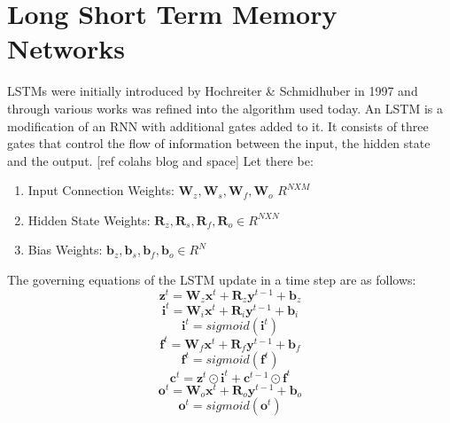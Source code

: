 \section{Long Short Term Memory Networks}
LSTMs were initially introduced by Hochreiter & Schmidhuber in 1997 and through various works was refined into the algorithm used today. An LSTM is a modification of an RNN with additional gates added to it. It consists of three gates that control the flow of information between the input, the hidden state and the output. [ref colahs blog and space]
Let there be:
\begin{enumerate}
    \item Input Connection Weights: $\mathbf{W}_z, \mathbf{W}_s, \mathbf{W}_f, \mathbf{W}_o$ \in $R^{NXM}$ 
    \item Hidden State Weights: $\mathbf{R}_z, \mathbf{R}_s, \mathbf{R}_f, \mathbf{R}_o \in R^{NXN}$
    \item Bias Weights: $\mathbf{b}_z, \mathbf{b}_s, \mathbf{b}_f, \mathbf{b}_o \in R^{N}$
\end{enumerate}
The governing equations of the LSTM update in a time step are as follows:
\begin{equation}
\mathbf{z}^t = \mathbf{W}_z\mathbf{x}^t + \mathbf{R}_z\mathbf{y}^{t-1} + \mathbf{b}_z 
\end{equation}
\begin{equation}
\mathbf{i}^t = \mathbf{W}_i\mathbf{x}^t + \mathbf{R}_i\mathbf{y}^{t-1} + \mathbf{b}_i
\end{equation}
\begin{equation}
\mathbf{i}^t = sigmoid(\mathbf{i}^t)
\end{equation}
\begin{equation}
\mathbf{f}^t = \mathbf{W}_f\mathbf{x}^t + \mathbf{R}_f\mathbf{y}^{t-1} + \mathbf{b}_f
\end{equation}
\begin{equation}
\mathbf{f}^t = sigmoid(\mathbf{f}^t)
\end{equation}
\begin{equation}
\mathbf{c}^t = \mathbf{z}^t\odot\mathbf{i}^t + \mathbf{c}^{t-1}\odot\mathbf{f}^t
\end{equation}
\begin{equation}
\mathbf{o}^t = \mathbf{W}_o\mathbf{x}^t + \mathbf{R}_o\mathbf{y}^{t-1} + \mathbf{b}_o
\end{equation}
\begin{equation}
\mathbf{o}^t = sigmoid(\mathbf{o}^t)
\end{equation}

